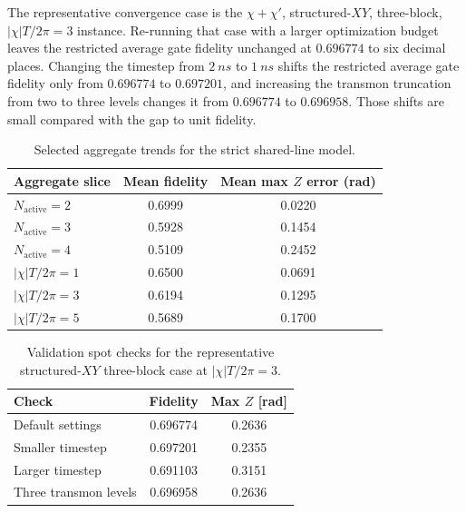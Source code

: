 \documentclass[aps,pra,twocolumn,reprint,floatfix,amsmath,amssymb]{revtex4-2}
\begin{document}
The representative convergence case is the \(\chi+\chi'\), structured-\(XY\), three-block, \(|\chi|T/2\pi=3\) instance. Re-running that case with a larger optimization budget leaves the restricted average gate fidelity unchanged at \(0.696774\) to six decimal places. Changing the timestep from \(\SI{2}{ns}\) to \(\SI{1}{ns}\) shifts the restricted average gate fidelity only from \(0.696774\) to \(0.697201\), and increasing the transmon truncation from two to three levels changes it from \(0.696774\) to \(0.696958\). Those shifts are small compared with the gap to unit fidelity.

\begin{table}[tb]
  \centering
  \caption{Selected aggregate trends for the strict shared-line model.}
  \label{tab:aggregates}
  \begin{tabular}{@{}lcc@{}}
    \toprule
    Aggregate slice & Mean fidelity & Mean max \(Z\) error (rad) \\
    \midrule
    \(N_{\mathrm{active}}=2\) & 0.6999 & 0.0220 \\
    \(N_{\mathrm{active}}=3\) & 0.5928 & 0.1454 \\
    \(N_{\mathrm{active}}=4\) & 0.5109 & 0.2452 \\
    \(|\chi|T/2\pi=1\) & 0.6500 & 0.0691 \\
    \(|\chi|T/2\pi=3\) & 0.6194 & 0.1295 \\
    \(|\chi|T/2\pi=5\) & 0.5689 & 0.1700 \\
    \bottomrule
  \end{tabular}
\end{table}

\begin{table}[tb]
  \centering
  \small
  \caption{Validation spot checks for the representative structured-\(XY\) three-block case at \(|\chi|T/2\pi=3\).}
  \label{tab:validation}
  \begin{tabular}{@{}lcc@{}}
    \toprule
    Check & Fidelity & Max \(Z\) [rad] \\
    \midrule
    Default settings & 0.696774 & 0.2636 \\
    Smaller timestep & 0.697201 & 0.2355 \\
    Larger timestep & 0.691103 & 0.3151 \\
    Three transmon levels & 0.696958 & 0.2636 \\
    \bottomrule
  \end{tabular}
\end{table}
\end{document}

